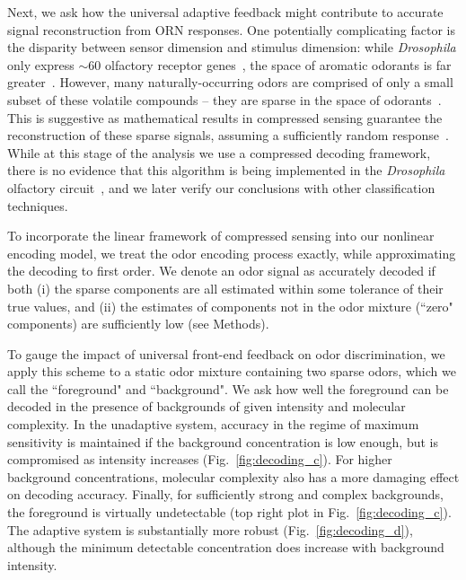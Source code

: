 \documentclass[9pt,twocolumn,twoside,lineno]{pnas-new}
\begin{document}
Next, we ask how the universal adaptive feedback might contribute to accurate signal reconstruction from ORN responses.  One potentially complicating factor is the disparity between sensor dimension and stimulus dimension: while \textit{Drosophila} only express $\sim 60$ olfactory receptor genes~\cite{olfactory_sensory_map}, the space of aromatic odorants is far greater~\cite{vijay_1}. However, many naturally-occurring odors are comprised of only a small subset of these volatile compounds -- they are sparse in the space of odorants~\cite{vijay_1}. This is suggestive as mathematical results in compressed sensing guarantee the reconstruction of these sparse signals, assuming a sufficiently random response~\cite{CS_donoho, CS_tao, CS_ganguli}. While at this stage of the analysis we use a compressed decoding framework, there is no evidence that this algorithm is being implemented in the \textit{Drosophila} olfactory circuit~\cite{chlovskii_pevlavan}, and we later verify our conclusions with other classification techniques. 

To incorporate the linear framework of compressed sensing into our nonlinear encoding model, we treat the odor encoding process exactly, while approximating the decoding to first order. We denote an odor signal as accurately decoded if both (i) the sparse components are all estimated within some tolerance of their true values, and (ii) the estimates of components not in the odor mixture (``zero" components) are sufficiently low (see Methods). 

To gauge the impact of universal front-end feedback on odor discrimination, we apply this scheme to a static odor mixture containing two sparse odors, which we call the ``foreground" and ``background". We ask how well the foreground can be decoded in the presence of backgrounds of given intensity and molecular complexity. In the unadaptive system, accuracy in the regime of maximum sensitivity is maintained if the background concentration is low enough, but is  compromised as intensity increases (Fig.~\ref{fig:decoding_c}). For higher background concentrations, molecular complexity also has a more damaging effect on decoding accuracy. Finally, for sufficiently strong and complex backgrounds, the foreground is virtually undetectable (top right plot in Fig.~\ref{fig:decoding_c}). The adaptive system is substantially more robust (Fig.~\ref{fig:decoding_d}), although the minimum detectable concentration does increase with background intensity. 
\end{document}
